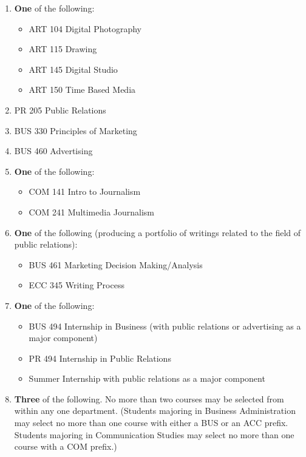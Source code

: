 \documentclass[
  letterpaper,
]{scrbook}
\providecommand{\tightlist}{%
  \setlength{\itemsep}{0pt}\setlength{\parskip}{0pt}}
\begin{document}
\begin{enumerate}
\def\labelenumi{\arabic{enumi}.}
\tightlist
\item
  \textbf{One} of the following:

  \begin{itemize}
  \tightlist
  \item
    ART 104 Digital Photography\\
  \item
    ART 115 Drawing\\
  \item
    ART 145 Digital Studio\\
  \item
    ART 150 Time Based Media\\
  \end{itemize}
\item
  PR 205 Public Relations\\
\item
  BUS 330 Principles of Marketing\\
\item
  BUS 460 Advertising\\
\item
  \textbf{One} of the following:

  \begin{itemize}
  \tightlist
  \item
    COM 141 Intro to Journalism\\
  \item
    COM 241 Multimedia Journalism\\
  \end{itemize}
\item
  \textbf{One} of the following (producing a portfolio of writings
  related to the field of public relations):

  \begin{itemize}
  \tightlist
  \item
    BUS 461 Marketing Decision Making/Analysis\\
  \item
    ECC 345 Writing Process\\
  \end{itemize}
\item
  \textbf{One} of the following:

  \begin{itemize}
  \tightlist
  \item
    BUS 494 Internship in Business (with public relations or advertising
    as a major component)\\
  \item
    PR 494 Internship in Public Relations\\
  \item
    Summer Internship with public relations as a major component\\
  \end{itemize}
\item
  \textbf{Three} of the following. No more than two courses may be
  selected from within any one department. (Students majoring in
  Business Administration may select no more than one course with either
  a BUS or an ACC prefix. Students majoring in Communication Studies may
  select no more than one course with a COM prefix.)


\end{enumerate}
\end{document}
